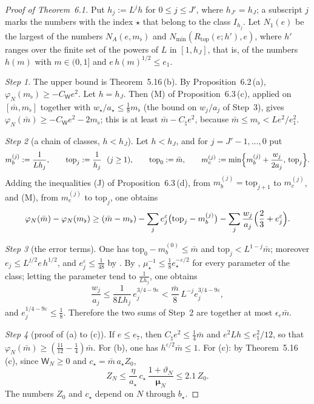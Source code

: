 \documentclass[11pt,letterpaper,reqno]{amsart}
\theoremstyle{definition}
\begin{document}
\begin{proof}[Proof of Theorem~6.1]
Put $h_j:=L^jh$ for $0\le j\le J'$, where $h_{J'}=h_J$;
a subscript $j$ marks the numbers with the index $\star$ that belong to the class $I_{h_j}$.
Let $N_1(e)$ be the largest of the numbers $N_A(e,m_\flat)$ and $N_{\min}(R_{\mathrm{top}}(e;h'),e)$, where $h'$ ranges over the finite set of the powers of $L$ in $[1,h_J]$, that is, of the numbers $h(m)$ with $m\in(0,1]$ and $e\,h(m)^{1/2}\le e_1$.

\emph{Step 1}.
The upper bound is Theorem~5.16\,(b).
By Proposition~6.2\,(a), $\varphi_N(m_\flat)\ge-C_{\mathsf W}e^2$.
Let $h=h_J$.
Then (M) of Proposition~6.3\,(c), applied on $[\bar m,m_\flat]$ together with $w_\star/a_\star\le\frac18m_\flat$ (the bound on $w_j/a_j$ of Step~3), gives $\varphi_N(\bar m)\ge-C_{\mathsf W}e^2-2m_\flat$;
this is at least $\bar m-C_\natural e^2$, because $\bar m\le m_\flat<Le^2/e_1^2$.

\emph{Step 2} (a chain of classes, $h<h_J$).
Let $h<h_J$, and for $j=J'-1,\dots,0$ put
\begin{equation*}
m_b^{(j)}:=\frac1{Lh_j},\qquad\mathrm{top}_j:=\frac1{h_j}\ \ (j\ge1),\qquad\mathrm{top}_0:=\bar m,\qquad m_c^{(j)}:=\min\Bigl\{m_b^{(j)}+\frac{w_j}{2a_j},\,\mathrm{top}_j\Bigr\}.
\end{equation*}
Adding the inequalities (J) of Proposition~6.3\,(d), from $m_b^{(j)}=\mathrm{top}_{j+1}$ to $m_c^{(j)}$, and (M), from $m_c^{(j)}$ to $\mathrm{top}_j$, one obtains
\begin{equation*}
\varphi_N(\bar m)-\varphi_N(m_\flat)\ge(\bar m-m_\flat)-\sum_je_j^\varepsilon\bigl(\mathrm{top}_j-m_b^{(j)}\bigr)-\sum_j\frac{w_j}{a_j}\Bigl(\frac23+e_j^\varepsilon\Bigr).
\end{equation*}

\emph{Step 3} (the error terms).
One has $\mathrm{top}_0-m_b^{(0)}\le\bar m$ and $\mathrm{top}_j<L^{1-j}\bar m$;
moreover $e_j\le L^{j/2}e\,h^{1/2}$, and $e_j^\varepsilon\le\frac1{48}$ by \cite[(fl)]{QEDIII}.
By \cite[(T2)]{QEDIII}, $\mu_\star^{-1}\le\frac18e_\star^{-\varepsilon/2}$ for every parameter of the class;
letting the parameter tend to $\frac1{Lh_j}$, one obtains
\begin{equation*}
\frac{w_j}{a_j}\le\frac1{8Lh_j}\,e_j^{3/4-9\varepsilon}<\frac{\bar m}8\,L^{-j}e_j^{3/4-9\varepsilon},
\end{equation*}
and $e_j^{1/4-9\varepsilon}\le\frac18$.
Therefore the two sums of Step~2 are together at most $\epsilon_e\bar m$.

\emph{Step 4} (proof of (a) to (c)).
If $e\le e_7$, then $C_\natural e^2\le\frac14\bar m$ and $e^2Lh\le e_1^2/12$, so that $\varphi_N(\bar m)\ge(\frac{11}{12}-\frac14)\bar m$.
For (b), one has $h^{\varepsilon/2}\bar m\le1$.
For (c): by Theorem~5.16\,(c), since $\mathsf W_N\ge0$ and $c_\star=\bar m\,a_\star Z_0$,
\begin{equation*}
Z_N\le\frac\eta{a_\star}\,c_\star\,\frac{1+\vartheta_N}{\boldsymbol\mu_N}\le2.1\,Z_0 .
\end{equation*}
The numbers $Z_0$ and $c_\star$ depend on $N$ through $b_\star$.
\end{proof}
\end{document}
